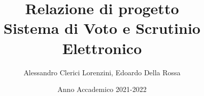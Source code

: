 \documentclass{report}
\begin{document}
\title{Relazione di progetto\\
\large Sistema di Voto e Scrutinio Elettronico}
\author{Alessandro Clerici Lorenzini, Edoardo Della Rossa}
\date{Anno Accademico 2021-2022}

\maketitle
\tableofcontents









\appendix




\end{document}
